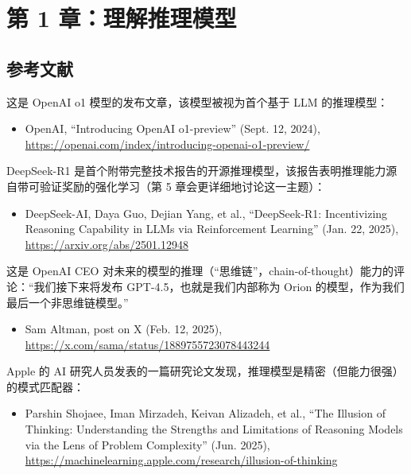 \section{第 1 章：理解推理模型}

\subsection{参考文献}

这是 OpenAI o1 模型的发布文章，该模型被视为首个基于 LLM 的推理模型：

\begin{itemize}
\item OpenAI, “Introducing OpenAI o1-preview” (Sept. 12, 2024), \href{https://openai.com/index/introducing-openai-o1-preview/}{https://openai.com/index/introducing-openai-o1-preview/}
\end{itemize}

DeepSeek-R1 是首个附带完整技术报告的开源推理模型，该报告表明推理能力源自带可验证奖励的强化学习（第 5 章会更详细地讨论这一主题）：

\begin{itemize}
\item DeepSeek-AI, Daya Guo, Dejian Yang, et al., “DeepSeek-R1: Incentivizing Reasoning Capability in LLMs via Reinforcement Learning” (Jan. 22, 2025), \href{https://arxiv.org/abs/2501.12948}{https://arxiv.org/abs/2501.12948}
\end{itemize}

这是 OpenAI CEO 对未来的模型的推理（“思维链”，chain-of-thought）能力的评论：“我们接下来将发布 GPT-4.5，也就是我们内部称为 Orion 的模型，作为我们最后一个非思维链模型。”

\begin{itemize}
\item Sam Altman, post on X (Feb. 12, 2025), \href{https://x.com/sama/status/1889755723078443244}{https://x.com/sama/status/1889755723078443244}
\end{itemize}

Apple 的 AI 研究人员发表的一篇研究论文发现，推理模型是精密（但能力很强）的模式匹配器：

\begin{itemize}
\item Parshin Shojaee, Iman Mirzadeh, Keivan Alizadeh, et al., “The Illusion of Thinking: Understanding the Strengths and Limitations of Reasoning Models via the Lens of Problem Complexity” (Jun. 2025), \href{https://machinelearning.apple.com/research/illusion-of-thinking}{https://machinelearning.apple.com/research/illusion-of-thinking}
\end{itemize}

